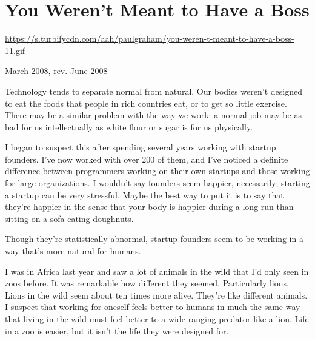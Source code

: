 \chapter{You Weren't Meant to Have a Boss}


            
              
                \href{https://s.turbifycdn.com/aah/paulgraham/you-weren-t-meant-to-have-a-boss-11.gif}{https://s.turbifycdn.com/aah/paulgraham/you-weren-t-meant-to-have-a-boss-11.gif}




                  
                    March 2008, rev. June 2008

Technology tends to
                    separate normal from natural. Our bodies weren't designed to
                    eat the foods that people in rich countries eat, or to get
                    so little exercise. There may be a similar problem with the
                    way we work: a normal job may be as bad for us
                    intellectually as white flour or sugar is for us
                    physically.

I began to suspect this after
                    spending several years working with startup founders. I've
                    now worked with over 200 of them, and I've noticed a
                    definite difference between programmers working on their own
                    startups and those working for large organizations. I
                    wouldn't say founders seem happier, necessarily; starting a
                    startup can be very stressful. Maybe the best way to put it
                    is to say that they're happier in the sense that your body
                    is happier during a long run than sitting on a sofa eating
                    doughnuts.

Though they're statistically abnormal,
                    startup founders seem to be working in a way that's more
                    natural for humans.

I was in Africa last year and
                    saw a lot of animals in the wild that I'd only seen in zoos
                    before. It was remarkable how different they seemed.
                    Particularly lions. Lions in the wild seem about ten times
                    more alive. They're like different animals. I suspect that
                    working for oneself feels better to humans in much the same
                    way that living in the wild must feel better to a
                    wide-ranging predator like a lion. Life in a zoo is easier,
                    but it isn't the life they were designed for.


